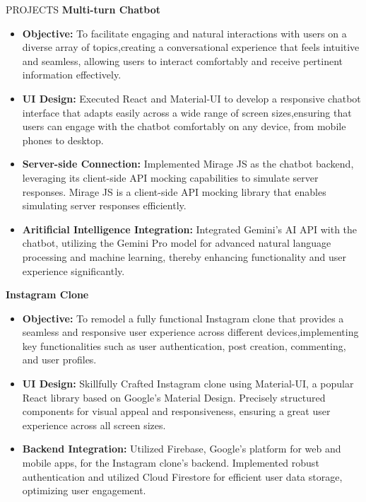 \documentclass{resume} %
\begin{document}
\vspace{0em}
\begin{rSection}{PROJECTS}
    \hspace*{0.1cm}
    \textbf{Multi-turn Chatbot}
    \begin{itemize}[label={•}]
     \item \textbf{Objective:} To facilitate engaging and natural interactions with users on a diverse array of topics,creating a conversational experience that feels intuitive and seamless, allowing users to interact comfortably and receive pertinent information effectively.
             \item \textbf{UI Design:} Executed React and Material-UI to develop a responsive chatbot interface that adapts easily across a wide range of screen sizes,ensuring that users can engage with the chatbot comfortably on any device, from mobile phones to desktop.
            \item\textbf{Server-side Connection:} Implemented Mirage JS as the chatbot backend, leveraging its client-side API mocking capabilities to simulate server responses. Mirage JS is a client-side API mocking library that enables simulating server responses efficiently.
            \item\textbf{Aritificial Intelligence Integration:} Integrated Gemini's AI API with the chatbot, utilizing the Gemini Pro model for advanced natural language processing and machine learning, thereby enhancing functionality and user experience significantly.
    \end{itemize}
    \hspace*{0.1cm}
    \textbf{Instagram Clone}
            \begin{itemize}[label={•}]
             \item \textbf{Objective:} To remodel a fully functional Instagram clone that provides a seamless and responsive user experience across different devices,implementing key functionalities such as user authentication, post creation, commenting, and user profiles.
             \item \textbf{UI Design:} Skillfully Crafted Instagram clone using Material-UI, a popular React library based on Google's Material Design. Precisely structured components for visual appeal and responsiveness, ensuring a great user experience across all screen sizes.
             \item\textbf{Backend Integration:} Utilized Firebase, Google's platform for web and mobile apps, for the Instagram clone's backend. Implemented robust authentication and utilized Cloud Firestore for efficient user data storage, optimizing user engagement.

\end{itemize}
\end{rSection}
\end{document}
